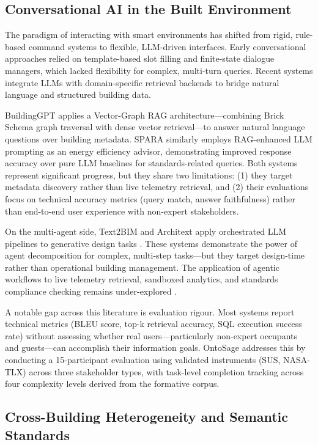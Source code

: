 \documentclass[acmsmall]{acmart}
\begin{document}
\subsection{Conversational AI in the Built Environment}

The paradigm of interacting with smart environments has shifted from rigid, rule-based command systems to flexible, LLM-driven interfaces. Early conversational approaches relied on template-based slot filling and finite-state dialogue managers, which lacked flexibility for complex, multi-turn queries. Recent systems integrate LLMs with domain-specific retrieval backends to bridge natural language and structured building data.

BuildingGPT \cite{du2025} applies a Vector-Graph RAG architecture---combining Brick Schema graph traversal with dense vector retrieval---to answer natural language questions over building metadata. SPARA \cite{Karjou_2025} similarly employs RAG-enhanced LLM prompting as an energy efficiency advisor, demonstrating improved response accuracy over pure LLM baselines for standards-related queries. Both systems represent significant progress, but they share two limitations: (1) they target metadata discovery rather than live telemetry retrieval, and (2) their evaluations focus on technical accuracy metrics (query match, answer faithfulness) rather than end-to-end user experience with non-expert stakeholders.

On the multi-agent side, Text2BIM and Architext apply orchestrated LLM pipelines to generative design tasks \cite{helmi2025,du2024}. These systems demonstrate the power of agent decomposition for complex, multi-step tasks---but they target design-time rather than operational building management. The application of agentic workflows to live telemetry retrieval, sandboxed analytics, and standards compliance checking remains under-explored \cite{shi2025}.

A notable gap across this literature is evaluation rigour. Most systems report technical metrics (BLEU score, top-k retrieval accuracy, SQL execution success rate) without assessing whether real users---particularly non-expert occupants and guests---can accomplish their information goals. OntoSage addresses this by conducting a 15-participant evaluation using validated instruments (SUS, NASA-TLX) across three stakeholder types, with task-level completion tracking across four complexity levels derived from the formative corpus.

\subsection{Cross-Building Heterogeneity and Semantic Standards}
\end{document}
